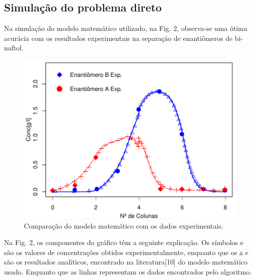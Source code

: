 \documentclass[por]{Template_SBEF}
\begin{document}
\subsection{Simulação do problema direto}
Na simulação do modelo matemático utilizado, na Fig. 2, observa-se uma ótima acurácia com os resultados experimentais na separação de enantiômeros de bi-naftol.
\begin{figure}[H] 
	\centering
	\includegraphics[width=.8\columnwidth]{Arquivos/problema.pdf} 
	\caption{Comparação do modelo matemático com os dados experimentais.} 
\end{figure}

Na Fig. 2, os componentes do gráfico têm a seguinte explicação. Os símbolos  e  são os valores de concentrações obtidos experimentalmente, enquanto que os $\vartriangle$ e  são os resultados analíticos, encontrado na literatura[10] do modelo matemático usado. Enquanto que as linhas representam os dados encontrados pelo algoritmo.
\end{document}
